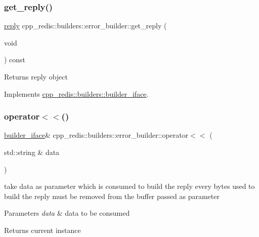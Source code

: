 \subsubsection{\texorpdfstring{get\+\_\+reply()}{get\_reply()}}
{\footnotesize\ttfamily \hyperlink{classcpp__redis_1_1reply}{reply} cpp\+\_\+redis\+::builders\+::error\+\_\+builder\+::get\+\_\+reply (\begin{DoxyParamCaption}\item[{void}]{ }\end{DoxyParamCaption}) const\hspace{0.3cm}{\ttfamily [virtual]}}

\begin{DoxyReturn}{Returns}
reply object 
\end{DoxyReturn}


Implements \hyperlink{classcpp__redis_1_1builders_1_1builder__iface_afd2ff2c2371c2a486116543b638b9413}{cpp\+\_\+redis\+::builders\+::builder\+\_\+iface}.

\mbox{\label{classcpp__redis_1_1builders_1_1error__builder_af5ac542be148d6f8500de79fa3164798}} 
\subsubsection{\texorpdfstring{operator$<$$<$()}{operator<<()}}
{\footnotesize\ttfamily \hyperlink{classcpp__redis_1_1builders_1_1builder__iface}{builder\+\_\+iface}\& cpp\+\_\+redis\+::builders\+::error\+\_\+builder\+::operator$<$$<$ (\begin{DoxyParamCaption}\item[{std\+::string \&}]{data }\end{DoxyParamCaption})\hspace{0.3cm}{\ttfamily [virtual]}}

take data as parameter which is consumed to build the reply every bytes used to build the reply must be removed from the buffer passed as parameter


\begin{DoxyParams}{Parameters}
{\em data} & data to be consumed \\
\hline
\end{DoxyParams}
\begin{DoxyReturn}{Returns}
current instance 
\end{DoxyReturn}


